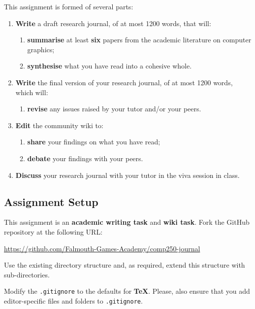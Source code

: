 \documentclass{../fal_assignment}
\begin{document}
This assignment is formed of several parts:

\begin{enumerate}[label=(\Alph*)]
    \item \textbf{Write} a draft research journal, of at most 1200 words, that will:
    	\begin{enumerate}[label=(\roman*)]
    		\item \textbf{summarise} at least \textbf{six} papers from the academic literature on computer graphics;
    		\item \textbf{synthesise} what you have read into a cohesive whole.
    	\end{enumerate}
    \item \textbf{Write} the final version of your research journal, of at most 1200 words, which will:
    	\begin{enumerate}[label=(\roman*)]
    		\item \textbf{revise} any issues raised by your tutor and/or your peers.
    	\end{enumerate}
    \item \textbf{Edit} the community wiki to:
    	\begin{enumerate}[label=(\roman*)]
    		\item \textbf{share} your findings on what you have read;
    		\item \textbf{debate} your findings with your peers.
    	\end{enumerate}
    \item \textbf{Discuss} your research journal with your tutor in the viva session in class.
\end{enumerate}

\subsection*{Assignment Setup}

This assignment is an \textbf{academic writing task} and \textbf{wiki task}. Fork the GitHub repository at the following URL:

\indent \url{https://github.com/Falmouth-Games-Academy/comp250-journal}

Use the existing directory structure and, as required, extend this structure with sub-directories.

Modify the \texttt{.gitignore} to the defaults for \textbf{TeX}. Please, also ensure that you add editor-specific files and folders to \texttt{.gitignore}. 
\end{document}

